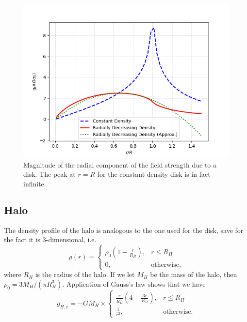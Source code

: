 \begin{figure}[htp]
    \centering
    \includegraphics[scale=0.6]{chapters/test-models/img/disk-field.png}
    \caption{Magnitude of the radial component of the field strength due to a disk.
        The peak at $r=R$ for the constant density disk is in fact infinite.}
    \label{fig:radial-strength-disk}
\end{figure}

\subsection{Halo}
The density profile of the halo is analogous to the one used for the disk, save for the fact it is 3-dimensional, i.e.
\begin{equation*}
    \rho(r) =
    \begin{cases}
        \rho_0\left(1 - \frac{r}{R_H}\right), & r \leq R_H        \\
        0,                                    & \text{otherwise},
    \end{cases}
\end{equation*}
where $R_H$ is the radius of the halo.
If we let $M_H$ be the mass of the halo, then $\rho_0 = 3M_H / (\pi R_H^3)$.
Application of Gauss's law shows that we have
\begin{equation*}
    g_{H,r} = -G M_H \times
    \begin{cases}
        \frac{r}{R_H^3}\left(4 - \frac{3r}{R_H}\right), & r \leq R_H        \\
        \frac{1}{r^2},                                  & \text{otherwise}.
    \end{cases}
\end{equation*}

